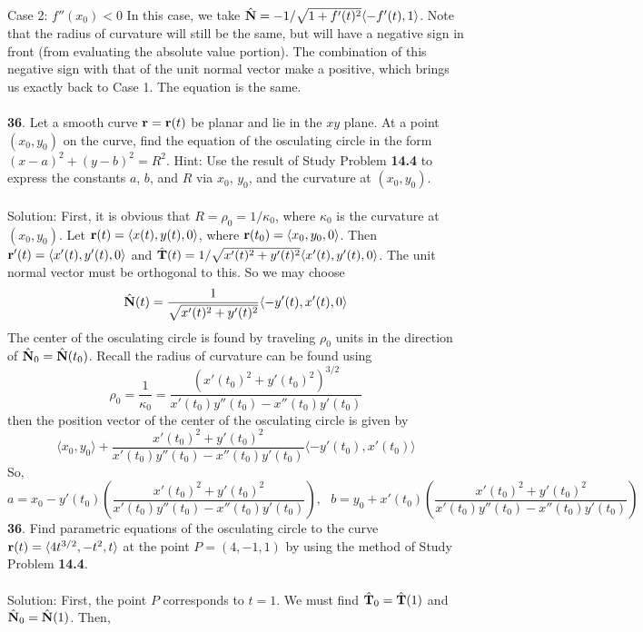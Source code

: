 \documentclass[12pt]{amsbook}
\newcommand{\la}{\langle}
\newcommand{\ra}{\rangle}
\begin{document}
Case 2: $f''(x_0)<0$
In this case, we take $\hat{\bf N}=-1/\sqrt{1+f'(t)^2}\la -f'(t), 1 \ra$. Note that the radius of curvature will still be the same, but will have a negative sign in front (from evaluating the absolute value portion). The combination of this negative sign with that of the unit normal vector make a positive, which brings us exactly back to Case 1. The equation is the same. 
\\
\\
{\small\bf 36}. Let a smooth curve ${\bf r} = {\bf r}(t)$ be planar and lie in the $xy$ plane. At a
point $(x_0, y_0)$ on the curve, find the equation of the osculating circle in the
form $(x-a)^2+(y-b)^2=R^2$. Hint: Use the result of Study Problem {\bf 14.4} to
express the constants $a$, $b$, and $R$ via $x_0$, $y_0$, and the curvature at $(x_0, y_0)$.
\\
\\
{\sc Solution}: First, it is obvious that $R=\rho_0=1/\kappa_0$, where $\kappa_0$ is the curvature at $(x_0,y_0)$. Let ${\bf r}(t)=\la x(t),y(t),0 \ra$, where ${\bf r}(t_0)=\la x_0,y_0,0 \ra$. Then ${\bf r}'(t)=\la x'(t), y'(t), 0 \ra$ and $\hat{\bf T}(t)=1/\sqrt{x'(t)^2+y'(t)^2}\la x'(t),y'(t),0 \ra$. The unit normal vector must be orthogonal to this. So we may choose 
$$\hat{\bf N}(t)=\frac{1}{\sqrt{x'(t)^2+y'(t)^2}}\la -y'(t),x'(t),0 \ra$$
The center of the osculating circle is found by traveling $\rho_0$ units in the direction of $\hat{\bf N}_0=\hat{\bf N}(t_0)$. Recall the radius of curvature can be found using
$$\rho_0=\frac{1}{\kappa_0}=\frac{(x'(t_0)^2+y'(t_0)^2)^{3/2}}{x'(t_0)y''(t_0)-x''(t_0)y'(t_0)}$$
then the position vector of the center of the osculating circle is given by
$$\la x_0,y_0 \ra + \frac{x'(t_0)^2+y'(t_0)^2}{x'(t_0)y''(t_0)-x''(t_0)y'(t_0)}\la -y'(t_0),x'(t_0) \ra$$
So,
$$a=x_0-y'(t_0)(\frac{x'(t_0)^2+y'(t_0)^2}{x'(t_0)y''(t_0)-x''(t_0)y'(t_0)}), \ \ \ b=y_0+x'(t_0)(\frac{x'(t_0)^2+y'(t_0)^2}{x'(t_0)y''(t_0)-x''(t_0)y'(t_0)})$$
{\small\bf 36}. Find parametric equations of the osculating circle to the curve ${\bf r}(t)=\la 4t^{3/2}, -t^2, t \ra$ at the point $P = (4, -1, 1)$ by using the method of Study
Problem {\bf 14.4}.
\\
\\
{\sc Solution}: First, the point $P$ corresponds to $t=1$. We must find $\hat{\bf T}_0=\hat{\bf T}(1)$ and $\hat{\bf N}_0=\hat{\bf N}(1)$. Then,
\end{document}
